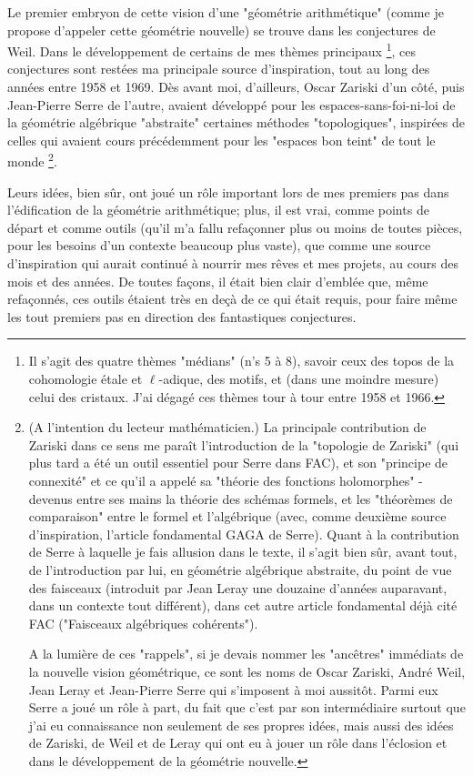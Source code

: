 Le premier embryon de cette vision d'une "géométrie arithmétique" (comme je propose d'appeler cette géométrie nouvelle) se trouve dans les conjectures de Weil. Dans le développement de certains de mes thèmes principaux \footnote{Il s'agit des quatre thèmes "médians" (n's 5 à 8), savoir ceux des topos de la cohomologie étale et $\ell$-adique, des motifs, et (dans une moindre mesure) celui des cristaux. J'ai dégagé ces thèmes tour à tour entre 1958 et 1966.}, ces conjectures sont restées ma principale source d'inspiration, tout au long des années entre 1958 et 1969. Dès avant moi, d'ailleurs, Oscar Zariski d'un côté, puis Jean-Pierre Serre de l'autre, avaient développé pour les espaces-sans-foi-ni-loi de la géométrie algébrique "abstraite" certaines méthodes "topologiques", inspirées de celles qui avaient cours précédemment pour les "espaces bon teint" de tout le monde \footnote{(A l'intention du lecteur mathématicien.) La principale contribution de Zariski dans ce sens me paraît l'introduction de la "topologie de Zariski" (qui plus tard a été un outil essentiel pour Serre dans FAC), et son "principe de connexité" et ce qu'il a appelé sa "théorie des fonctions holomorphes" - devenus entre ses mains la théorie des schémas formels, et les "théorèmes de comparaison" entre le formel et l'algébrique (avec, comme deuxième source d'inspiration, l'article fondamental GAGA de Serre). Quant à la contribution de Serre à laquelle je fais allusion dans le texte, il s'agit bien sûr, avant tout, de l'introduction par lui, en géométrie algébrique abstraite, du point de vue des faisceaux (introduit par Jean Leray une douzaine d'années auparavant, dans un contexte tout différent), dans cet autre article fondamental déjà cité FAC ("Faisceaux algébriques cohérents").

A la lumière de ces "rappels", si je devais nommer les "ancêtres" immédiats de la nouvelle vision géométrique, ce sont les noms de Oscar Zariski, André Weil, Jean Leray et Jean-Pierre Serre qui s'imposent à moi aussitôt. Parmi eux Serre a joué un rôle à part, du fait que c'est par son intermédiaire surtout que j'ai eu connaissance non seulement de ses propres idées, mais aussi des idées de Zariski, de Weil et de Leray qui ont eu à jouer un rôle dans l'éclosion et dans le développement de la géométrie nouvelle.}.

Leurs idées, bien sûr, ont joué un rôle important lors de mes premiers pas dans l'édification de la géométrie arithmétique; plus, il est vrai, comme points de départ et comme outils (qu'il m'a fallu refaçonner plus ou moins de toutes pièces, pour les besoins d'un contexte beaucoup plus vaste), que comme une source d'inspiration qui aurait continué à nourrir mes rêves et mes projets, au cours des mois et des années. De toutes façons, il était bien clair d'emblée que, même refaçonnés, ces outils étaient très en deçà de ce qui était requis, pour faire même les tout premiers pas en direction des fantastiques conjectures.



